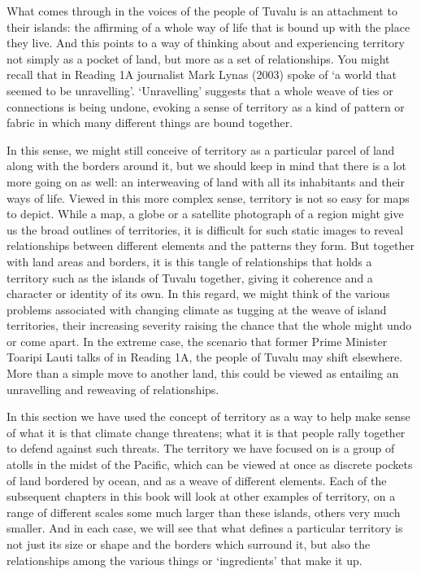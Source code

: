 \documentclass[letterpaper,10pt,english]{sphinxmanual}
\begin{document}
What comes through in the voices of the people of Tuvalu is an attachment to their islands: the affirming of a whole way of life that is bound up with the place they live. And this points to a way of thinking about and experiencing territory not simply as a pocket of land, but more as a set of relationships. You might recall that in Reading 1A journalist Mark Lynas (2003) spoke of ‘a world that seemed to be unravelling’. ‘Unravelling’ suggests that a whole weave of ties or connections is being
undone, evoking a sense of territory as a kind of pattern or fabric in which many different things are bound together.

In this sense, we might still conceive of territory as a particular parcel of land along with the borders around it, but we should keep in mind that there is a lot more going on as well: an interweaving of land with all its inhabitants and their ways of life. Viewed in this more complex sense, territory is not so easy for maps to depict. While a map, a globe or a satellite photograph of a region might give us the broad outlines of territories, it is difficult for such static images to reveal
relationships between different elements and the patterns they form. But together with land areas and borders, it is this tangle of relationships that holds a territory such as the islands of Tuvalu together, giving it coherence and a character or identity of its own. In this regard, we might think of the various problems associated with changing climate as tugging at the weave of island territories, their increasing severity raising the chance that the whole might undo or come apart. In the
extreme case, the scenario that former Prime Minister Toaripi Lauti talks of in Reading 1A, the people of Tuvalu may shift elsewhere. More than a simple move to another land, this could be viewed as entailing an unravelling and re\sphinxhyphen{}weaving of relationships.

In this section we have used the concept of territory as a way to help make sense of what it is that climate change threatens; what it is that people rally together to defend against such threats. The territory we have focused on is a group of atolls in the midst of the Pacific, which can be viewed at once as discrete pockets of land bordered by ocean, and as a weave of different elements. Each of the subsequent chapters in this book will look at other examples of territory, on a range of
different scales \textendash{} some much larger than these islands, others very much smaller. And in each case, we will see that what defines a particular territory is not just its size or shape and the borders which surround it, but also the relationships among the various things or ‘ingredients’ that make it up.
\end{document}
